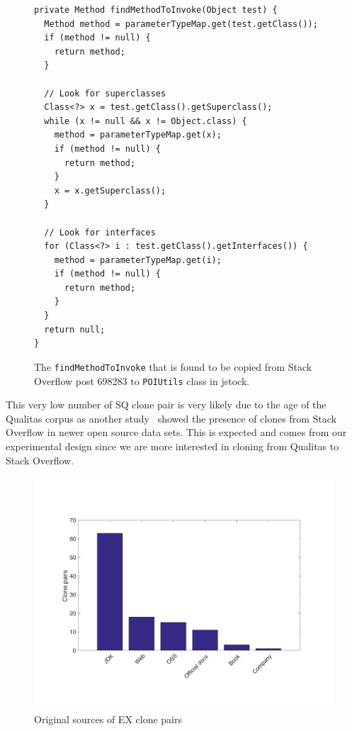 \documentclass[10pt,journal,compsoc]{IEEEtran}
\begin{document}
\begin{figure}
	\begin{lstlisting}
private Method findMethodToInvoke(Object test) {
  Method method = parameterTypeMap.get(test.getClass());
  if (method != null) {
    return method;
  }

  // Look for superclasses
  Class<?> x = test.getClass().getSuperclass();
  while (x != null && x != Object.class) {
    method = parameterTypeMap.get(x);
    if (method != null) {
      return method;
    }
    x = x.getSuperclass();
  }

  // Look for interfaces
  for (Class<?> i : test.getClass().getInterfaces()) {
    method = parameterTypeMap.get(i);
    if (method != null) {
      return method;
    }
  }
  return null;
}
	\end{lstlisting}\vspace{-2ex}
	\caption{The {\small\texttt{findMethodToInvoke}} that is found to be copied from Stack Overflow post 698283 to {\small\texttt{POIUtils}} class in \textsf{jstock}.}
	\label{fig:jstock_code}
\end{figure}

This very low number of SQ clone pair is very likely due to the age of the
Qualitas corpus as another study~\cite{An2017} showed the presence of clones
from Stack Overflow in newer open source data sets. This is expected and
comes from our experimental design since
we are more interested in cloning from Qualitas to Stack Overflow.

\begin{figure}
	\centering
	\includegraphics[width=0.9\linewidth]{ex_sources}
	\caption{Original sources of EX clone pairs}
	\label{fig:ex_sources}
\end{figure}
\end{document}
